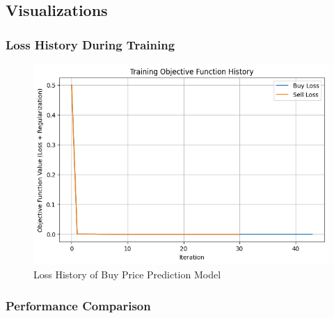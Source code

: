 \subsection{Visualizations}
\label{subsec:visualizations}

\subsubsection{Loss History During Training}\text{}


\begin{figure}[H]
    \centering
    \includegraphics[width=\linewidth]{images/loss_history}
    \caption{Loss History of Buy Price Prediction Model}
    \label{fig:buy_price_model_loss}
\end{figure}

\subsubsection{Performance Comparison}\text{}


